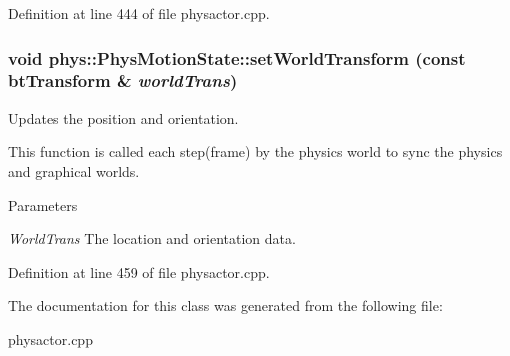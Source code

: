 Definition at line 444 of file physactor.cpp.

\hypertarget{classphys_1_1PhysMotionState_a91e372f8f474bb570e502ee42ec2deeb}{
\subsubsection[{setWorldTransform}]{\setlength{\rightskip}{0pt plus 5cm}void phys::PhysMotionState::setWorldTransform (const btTransform \& {\em worldTrans})}}
\label{dc/d0d/classphys_1_1PhysMotionState_a91e372f8f474bb570e502ee42ec2deeb}


Updates the position and orientation. 

This function is called each step(frame) by the physics world to sync the physics and graphical worlds. 
\begin{DoxyParams}{Parameters}
\item[{\em WorldTrans}]The location and orientation data. \end{DoxyParams}


Definition at line 459 of file physactor.cpp.



The documentation for this class was generated from the following file:\begin{DoxyCompactItemize}
\item 
physactor.cpp\end{DoxyCompactItemize}
